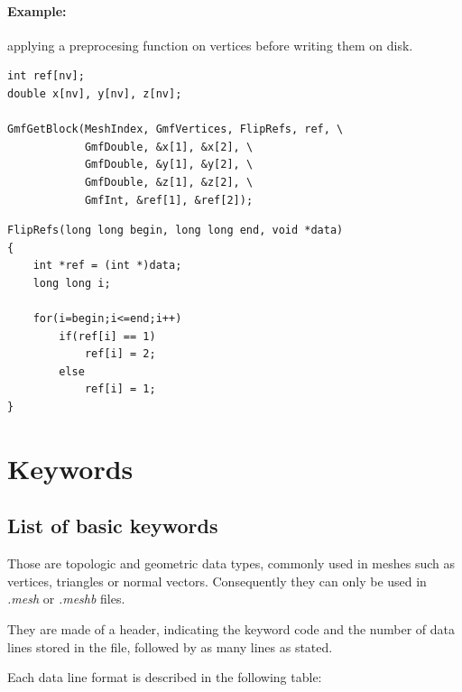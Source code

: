 \documentclass[a4paper,12pt]{article}
\begin{document}
\paragraph{Example:} applying a preprocesing function on vertices before writing them on disk.

\begin{tt}
\begin{verbatim}
int ref[nv];
double x[nv], y[nv], z[nv];

GmfGetBlock(MeshIndex, GmfVertices, FlipRefs, ref, \
            GmfDouble, &x[1], &x[2], \
            GmfDouble, &y[1], &y[2], \
            GmfDouble, &z[1], &z[2], \
            GmfInt, &ref[1], &ref[2]);
\end{verbatim}
\end{tt}
\normalfont

\begin{tt}
\begin{verbatim}
FlipRefs(long long begin, long long end, void *data)
{
    int *ref = (int *)data;
    long long i;

    for(i=begin;i<=end;i++)
        if(ref[i] == 1)
            ref[i] = 2;
        else
            ref[i] = 1;
}
\end{verbatim}
\end{tt}
\normalfont


%
%

\newpage
\section{Keywords}
\label{keywords}

\subsection{List of basic keywords}

Those are topologic and geometric data types, commonly used in meshes such as vertices, triangles or normal vectors. Consequently they can only be used in \emph{.mesh} or \emph{.meshb} files.

They are made of a header, indicating the keyword code and the number of data lines stored in the file, followed by as many lines as stated.

Each data line format is described in the following table:
\end{document}
